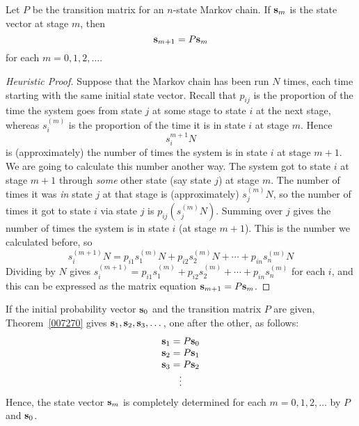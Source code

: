 \documentclass{ximera}
\begin{document}
\begin{theorem}\label{007270}
Let $P$ be the transition matrix for an $n$-state Markov chain. If ${\bf s}_{m}$ is the state vector at stage $m$, then
\begin{equation*}
{\bf s}_{m+1} = P{\bf s}_m
\end{equation*}
for each $m = 0, 1, 2, \dots$.
\end{theorem}

\begin{proof}[Heuristic Proof]
Suppose that the Markov chain has been run $N$ times, each time starting with the same initial state vector. Recall that $p_{ij}$ is the proportion of the time the system goes from state $j$ at some stage to state $i$ at the next stage, whereas $s_{i}^{(m)}$ is the proportion of the time it is in state $i$ at stage $m$. Hence
\begin{equation*}
s_{i}^{m+1}N
\end{equation*}
is (approximately) the number of times the system is in state $i$ at stage $m + 1$. We are going to calculate this number another way. The system got to state $i$ at stage $m + 1$ through \textit{some} other state (say state $j$) at stage $m$. The number of times it was \textit{in} state $j$ at that stage is (approximately) $s_{j}^{(m)}N$, so the number of times it got to state $i$ via state $j$ is $p_{ij}(s_{j}^{(m)}N)$. Summing over $j$ gives the number of times the system is in state $i$ (at stage $m + 1$). This is the number we calculated before, so
\begin{equation*}
s_{i}^{(m+1)}N = p_{i1}s_{1}^{(m)}N + p_{i2}s_{2}^{(m)}N + \cdots + p_{in}s_{n}^{(m)}N
\end{equation*}
Dividing by $N$ gives $s_{i}^{(m+1)} = p_{i1}s_{1}^{(m)} + p_{i2}s_{2}^{(m)} + \cdots + p_{in}s_{n}^{(m)}$ for each $i$, and this can be expressed as the matrix equation ${\bf s}_{m+1} = P{\bf s}_{m}$.
\end{proof}

If the initial probability vector ${\bf s}_{0}$ and the transition matrix $P$ are given, Theorem~\ref{007270} gives ${\bf s}_{1}, {\bf s}_{2}, {\bf s}_{3}, \dots$, one after the other, as follows:
\begin{equation*}
\begin{array}{c}
{\bf s}_{1} = P{\bf s}_0 \\
{\bf s}_{2} = P{\bf s}_1 \\
{\bf s}_{3} = P{\bf s}_2 \\
\vdots
\end{array}
\end{equation*}
Hence, the state vector ${\bf s}_{m}$ is completely determined for each $m = 0, 1, 2, \dots$ by $P$ and ${\bf s}_{0}$.
\end{document}

